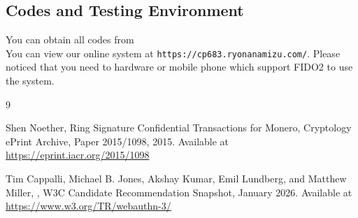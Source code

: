 \documentclass[letterpaper,11pt]{article}
\begin{document}
\begin{appendices}
    \section*{Codes and Testing Environment}

    You can obtain all codes from
    \\
    You can view our online system at \texttt{https://cp683.ryonanamizu.com/}. Please noticed that you need to hardware or mobile phone which support FIDO2 to use the system.
\end{appendices}


\begin{thebibliography}{9}

    Shen Noether,
    \newblock Ring Signature Confidential Transactions for Monero,
    \newblock Cryptology {ePrint} Archive, Paper 2015/1098, 2015.
    \newblock Available at \url{https://eprint.iacr.org/2015/1098}

    Tim Cappalli, Michael B. Jones, Akshay Kumar, Emil Lundberg, and Matthew Miller,
    ,
    \newblock W3C Candidate Recommendation Snapshot, January 2026.
    \newblock Available at \url{https://www.w3.org/TR/webauthn-3/}

\end{thebibliography}

\end{document}
